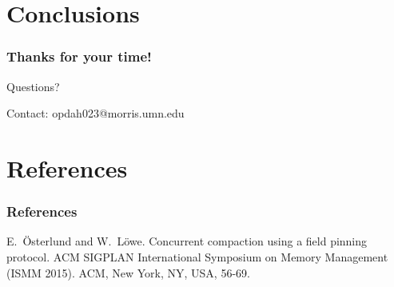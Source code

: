 \documentclass{beamer}
\newcommand{\linespace}{\vskip 0.25cm}
\begin{document}
\begin{frame}
\end{frame}



\section[Conclusions]{Conclusions}

\begin{frame}
	\frametitle{Thanks for your time!}
	
	\begin{center}
	{\huge Questions?}
	\end{center}	
	
	\linespace
	\linespace	
	
	\begin{center}
	Contact: opdah023@morris.umn.edu
	\end{center}
	
\end{frame}



\section*{References}

\begin{frame} 
	\frametitle{References} 
	
%	
%	
%  
%	

\begin{thebibliography}{lskdjf}

E.~\"{O}sterlund and W.~L\"{o}we.
\newblock Concurrent compaction using a field pinning protocol. 
 ACM SIGPLAN International Symposium on Memory Management (ISMM 2015). ACM, New York, NY, USA, 56-69.

\end{thebibliography}

\end{frame} 
\end{document}
